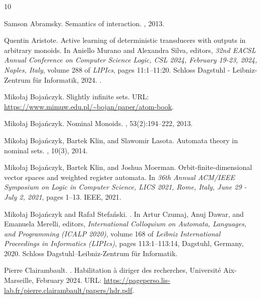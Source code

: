 \documentclass[10pt,a4paper]{amsart}
\numberwithin{equation}{section}
\theoremstyle{plain}
\begin{document}
\begin{thebibliography}{10}

Samson Abramsky.
\newblock Semantics of interaction.
, 2013.

Quentin Aristote.
\newblock Active learning of deterministic transducers with outputs in
  arbitrary monoids.
\newblock In Aniello Murano and Alexandra Silva, editors, {\em 32nd {EACSL}
  Annual Conference on Computer Science Logic, {CSL} 2024, February 19-23,
  2024, Naples, Italy}, volume 288 of {\em LIPIcs}, pages 11:1--11:20. Schloss
  Dagstuhl - Leibniz-Zentrum f{\"{u}}r Informatik, 2024.
\newblock \href {https://doi.org/10.4230/LIPICS.CSL.2024.11}
  {}.

Miko{\l}aj Boja\'nczyk.
\newblock Slightly infinite sets.
\newblock URL: \url{https://www.mimuw.edu.pl/~bojan/paper/atom-book}.

Miko{\l}aj Boja\'nczyk.
\newblock Nominal {{Monoids}}.
, 53(2):194--222, 2013.

Miko{\l}aj Boja\'nczyk, Bartek Klin, and Slawomir Lasota.
\newblock Automata theory in nominal sets.
, 10(3), 2014.

Miko{\l}aj Boja\'nczyk, Bartek Klin, and Joshua Moerman.
\newblock Orbit-finite-dimensional vector spaces and weighted register
  automata.
\newblock In {\em 36th Annual {ACM/IEEE} Symposium on Logic in Computer
  Science, {LICS} 2021, Rome, Italy, June 29 - July 2, 2021}, pages 1--13.
  {IEEE}, 2021.

Miko{\l}aj Boja{\'n}czyk and Rafa{\l} Stefa{\'n}ski.
.
\newblock In Artur Czumaj, Anuj Dawar, and Emanuela Merelli, editors, {\em
  International Colloquium on Automata, Languages, and Programming (ICALP
  2020)}, volume 168 of {\em Leibniz International Proceedings in Informatics
  (LIPIcs)}, pages 113:1--113:14, Dagstuhl, Germany, 2020. Schloss
  Dagstuhl--Leibniz-Zentrum f{\"u}r Informatik.

Pierre Clairambault.
.
\newblock Habilitation à diriger des recherches, {Université Aix-Marseille},
  February 2024.
\newblock URL:
  \url{https://pageperso.lis-lab.fr/pierre.clairambault/papers/hdr.pdf}.


\end{thebibliography}
\end{document}
